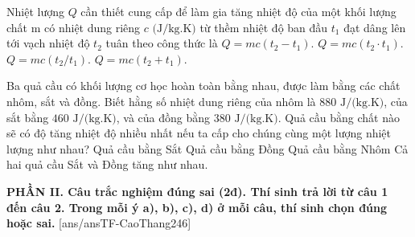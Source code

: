 \begin{ex}%
	Nhiệt lượng $Q$ cần thiết cung cấp để làm gia tăng nhiệt độ của một khối lượng chất m có nhiệt dung riêng $c\text{ (J/kg.K)}$ từ thềm nhiệt độ ban đầu $t_1$ đạt dâng lên tới vạch nhiệt độ $t_2$ tuân theo công thức là
	\choice
	{\True $Q=mc(t_2-t_1)$.}
	{$Q=mc(t_2 \cdot t_1)$.}
	{$Q=mc(t_2/t_1)$.}
	{$Q=mc(t_2+t_1)$.}
\end{ex}

\begin{ex}%
	Ba quả cầu có khối lượng cơ học hoàn toàn bằng nhau, được làm bằng các chất nhôm, sắt và đồng. Biết hằng số nhiệt dung riêng của nhôm là $880\text{ J/(kg.K)}$, của sắt bằng $460\text{ J/(kg.K)}$, và của đồng bằng $380\text{ J/(kg.K)}$. Quả cầu bằng chất nào sẽ có độ tăng nhiệt độ nhiều nhất nếu ta cấp cho chúng cùng một lượng nhiệt lượng như nhau?
	\choice
	{Quả cầu bằng Sắt}
	{\True Quả cầu bằng Đồng}
	{Quả cầu bằng Nhôm}
	{Cả hai quả cầu Sắt và Đồng tăng như nhau.}
\end{ex}


\noindent \textbf{PHẦN II. Câu trắc nghiệm đúng sai (2đ). Thí sinh trả lời từ câu 1 đến câu 2. Trong mỗi ý a), b), c), d) ở mỗi câu, thí sinh chọn đúng hoặc sai.}
[ans/ansTF-CaoThang246]

